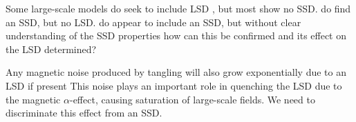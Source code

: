 \documentclass[preprint2]{aastex63}
\begin{document}
 Some large-scale models do seek to include LSD \citep[e.g.,][]{Korpi:1999b,
   Gressel:2008,HWK09,WA09,Pakmor17,SBADMN19,GE20},
     but most show
 no SSD. \citet{SBADMN19} do find an SSD, but no LSD.
 \citet{Gent:2013b,EGSFB16} do appear to include an SSD, but without clear
 understanding of the SSD properties how can this be confirmed and its
 effect on the LSD
     determined?
     
 Any magnetic noise produced by tangling will also grow exponentially due to
 an LSD if present
 This noise plays an important role in quenching the LSD due to the magnetic
 $\alpha$-effect, causing saturation of large-scale fields.
 We need to discriminate
      this effect from an SSD.   
\end{document}
